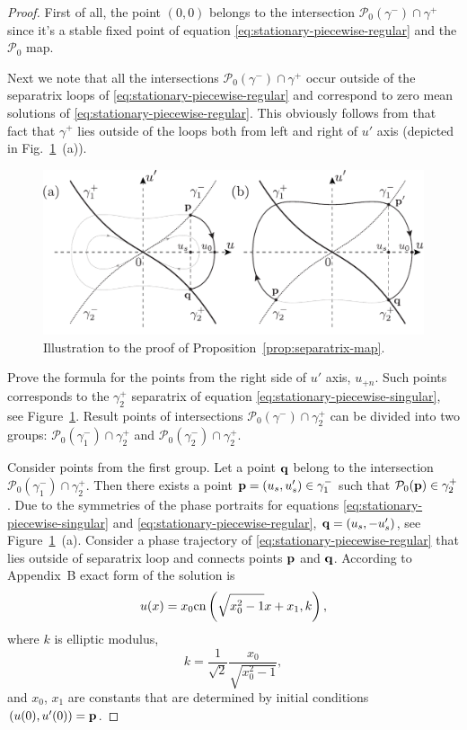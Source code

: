 \begin{proof}
	First of all, the point $(0, 0)$ belongs to the intersection $\mathcal{P}_0(\gamma^-) \cap \gamma^+$ since it's a stable fixed point of equation \eqref{eq:stationary-piecewise-regular} and the $\mathcal{P}_0$ map.

	Next we note that all the intersections $\mathcal{P}_0(\gamma^-) \cap \gamma^+$ occur outside of the separatrix loops of \eqref{eq:stationary-piecewise-regular} and correspond to zero mean solutions of \eqref{eq:stationary-piecewise-regular}.
	This obviously follows from that fact that $\gamma^+$ lies outside of the loops both from left and right of $u'$ axis (depicted in Fig.~\ref{fig:separatrix-map}~(a)).
	\begin{figure}[h]
	\centering
		\includegraphics[scale = 1]{pic/separatrix map}
		\caption{Illustration to the proof of Proposition~\ref{prop:separatrix-map}.}
	\label{fig:separatrix-map}
	\end{figure}
	
	Prove the formula for the points from the right side of $u'$ axis, $u_{+n}$.
	Such points corresponds to the $\gamma_2^+$ separatrix of equation \eqref{eq:stationary-piecewise-singular}, see Figure~\ref{fig:separatrix-map}.
	Result points of intersections $\mathcal{P}_0(\gamma^-) \cap \gamma_2^+$ can be divided into two groups: $\mathcal{P}_0(\gamma_1^-) \cap \gamma_2^+$ and $\mathcal{P}_0(\gamma_2^-) \cap \gamma_2^+$.

	Consider points from the first group.
	Let a point $\vb{q}$ belong to the intersection $\mathcal{P}_0(\gamma_1^-) \cap \gamma_2^+$.
	Then there exists a point $\vb{p} = (u_s, u_s') \in \gamma_1^-$ such that $\mathcal{P}_0(\vb{p}) \in \gamma_2^+$.
	Due to the symmetries of the phase portraits for equations \eqref{eq:stationary-piecewise-singular} and \eqref{eq:stationary-piecewise-regular}, $\vb{q} = (u_s, -u_s')$, see Figure~\ref{fig:separatrix-map}~(a).
	Consider a phase trajectory of \eqref{eq:stationary-piecewise-regular} that lies outside of separatrix loop and connects points $\vb{p}$ and $\vb{q}$.
	According to Appendix~B exact form of the solution is
	\begin{equation}
		u(x) = x_0 \mathrm{cn} \left( \sqrt{x_0^2 - 1} x + x_1, k \right),
	\label{eq:stationary-piecewise-regular-solution}
	\end{equation}
	where $k$ is elliptic modulus,
	\begin{equation}
		k = \dfrac{1}{\sqrt{2}} \dfrac{x_0}{\sqrt{x_0^2 - 1}},
	\end{equation}
	and $x_0$, $x_1$ are constants that are determined by initial conditions $(u(0), u'(0)) = \vb{p}$.
	

\end{proof}
